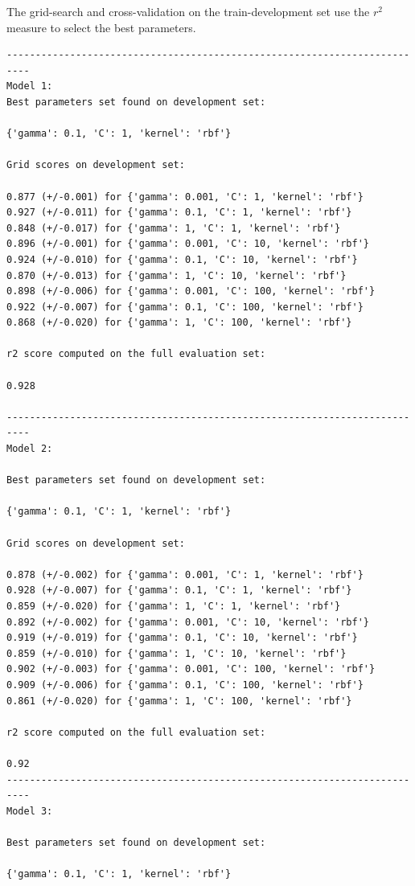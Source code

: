 The grid-search and cross-validation on the train-development set use the $r^2$ measure to select the best parameters. 

\begin{verbatim}
--------------------------------------------------------------------------
Model 1:
Best parameters set found on development set:

{'gamma': 0.1, 'C': 1, 'kernel': 'rbf'}

Grid scores on development set:

0.877 (+/-0.001) for {'gamma': 0.001, 'C': 1, 'kernel': 'rbf'}
0.927 (+/-0.011) for {'gamma': 0.1, 'C': 1, 'kernel': 'rbf'}
0.848 (+/-0.017) for {'gamma': 1, 'C': 1, 'kernel': 'rbf'}
0.896 (+/-0.001) for {'gamma': 0.001, 'C': 10, 'kernel': 'rbf'}
0.924 (+/-0.010) for {'gamma': 0.1, 'C': 10, 'kernel': 'rbf'}
0.870 (+/-0.013) for {'gamma': 1, 'C': 10, 'kernel': 'rbf'}
0.898 (+/-0.006) for {'gamma': 0.001, 'C': 100, 'kernel': 'rbf'}
0.922 (+/-0.007) for {'gamma': 0.1, 'C': 100, 'kernel': 'rbf'}
0.868 (+/-0.020) for {'gamma': 1, 'C': 100, 'kernel': 'rbf'}

r2 score computed on the full evaluation set:

0.928

--------------------------------------------------------------------------
Model 2:

Best parameters set found on development set:

{'gamma': 0.1, 'C': 1, 'kernel': 'rbf'}

Grid scores on development set:

0.878 (+/-0.002) for {'gamma': 0.001, 'C': 1, 'kernel': 'rbf'}
0.928 (+/-0.007) for {'gamma': 0.1, 'C': 1, 'kernel': 'rbf'}
0.859 (+/-0.020) for {'gamma': 1, 'C': 1, 'kernel': 'rbf'}
0.892 (+/-0.002) for {'gamma': 0.001, 'C': 10, 'kernel': 'rbf'}
0.919 (+/-0.019) for {'gamma': 0.1, 'C': 10, 'kernel': 'rbf'}
0.859 (+/-0.010) for {'gamma': 1, 'C': 10, 'kernel': 'rbf'}
0.902 (+/-0.003) for {'gamma': 0.001, 'C': 100, 'kernel': 'rbf'}
0.909 (+/-0.006) for {'gamma': 0.1, 'C': 100, 'kernel': 'rbf'}
0.861 (+/-0.020) for {'gamma': 1, 'C': 100, 'kernel': 'rbf'}

r2 score computed on the full evaluation set:

0.92
--------------------------------------------------------------------------
Model 3:

Best parameters set found on development set:

{'gamma': 0.1, 'C': 1, 'kernel': 'rbf'}


\end{verbatim}
